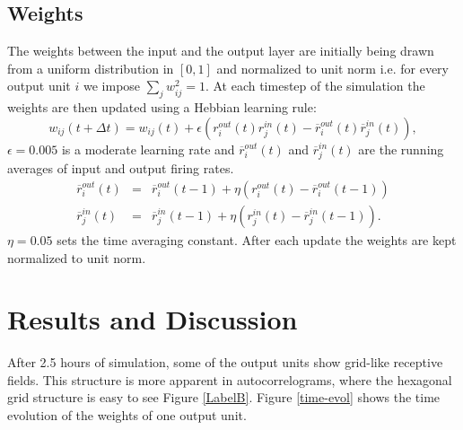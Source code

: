 \documentclass[a4paper, 12pt]{article}
\begin{document}
\subsection{Weights}
The weights between the input and the output layer are initially being drawn from a uniform distribution in $[0,1]$ and normalized to unit norm i.e. for every output unit $i$ we impose $\sum_jw^2_{ij}=1$. At each timestep of the simulation the weights are then updated using a Hebbian learning rule:  
\begin{equation}
w_{ij}(t+\Delta t)= w_{ij}(t)+ \epsilon(r_i^{out}(t)r_j^{in}(t)-\overline{r}_i^{out}(t)\overline{r}_j^{in}(t)),
\end{equation}
$\epsilon= 0.005$ is a moderate learning rate and $\overline{r}_i^{out}(t)$ and $\overline{r}_j^{in}(t)$ are the running averages of input and output firing rates.  
	\begin{eqnarray}
	\overline{r}_i^{out}(t) &=& \overline{r}_i^{out}(t-1)+ \eta(r_i^{out}(t)-\overline{r}_i^{out}(t-1))\\
	\overline{r}_j^{in}(t) &=& \overline{r}_j^{in}(t-1)+ \eta(r_j^{in}(t)-\overline{r}_j^{in}(t-1)).
	\end{eqnarray}
$\eta=0.05$ sets the time averaging constant. After each update the weights are kept normalized to unit norm. 
%
%

\section{Results and Discussion}
After 2.5 hours of simulation, some of the output units show grid-like receptive fields. This structure is more apparent in autocorrelograms, where the hexagonal grid structure is easy to see Figure \ref{LabelB}. Figure \ref{time-evol} shows the time evolution of the weights of one output unit.

\end{document}

